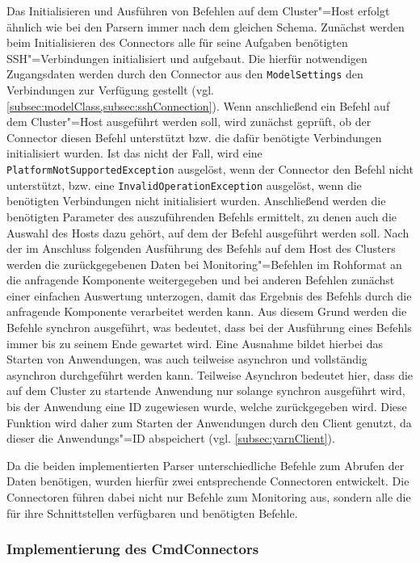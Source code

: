 Das Initialisieren und Ausführen von Befehlen auf dem Cluster"=Host erfolgt ähnlich wie bei den Parsern immer nach dem gleichen Schema.
Zunächst werden beim Initialisieren des Connectors alle für seine Aufgaben benötigten SSH"=Verbindungen initialisiert und aufgebaut.
Die hierfür notwendigen Zugangsdaten werden durch den Connector aus den \texttt{ModelSettings} den Verbindungen zur Verfügung gestellt (vgl. \cref{subsec:modelClass,subsec:sshConnection}).
Wenn anschließend ein Befehl auf dem Cluster"=Host ausgeführt werden soll, wird zunächst geprüft, ob der Connector diesen Befehl unterstützt bzw. die dafür benötigte Verbindungen initialisiert wurden.
Ist das nicht der Fall, wird eine \texttt{PlatformNotSupportedException} ausgelöst, wenn der Connector den Befehl nicht unterstützt, bzw. eine  \texttt{InvalidOperationException} ausgelöst, wenn die benötigten Verbindungen nicht initialisiert wurden.
Anschließend werden die benötigten Parameter des auszuführenden Befehls ermittelt, zu denen auch die Auswahl des Hosts dazu gehört, auf dem der Befehl ausgeführt werden soll.
Nach der im Anschluss folgenden Ausführung des Befehls auf dem Host des Clusters werden die zurückgegebenen Daten bei Monitoring"=Befehlen im Rohformat an die anfragende Komponente weitergegeben und bei anderen Befehlen zunächst einer einfachen Auswertung unterzogen, damit das Ergebnis des Befehls durch die anfragende Komponente verarbeitet werden kann.
Aus diesem Grund werden die Befehle synchron ausgeführt, was bedeutet, dass bei der Ausführung eines Befehls immer bis zu seinem Ende gewartet wird.
Eine Ausnahme bildet hierbei das Starten von Anwendungen, was auch teilweise asynchron und vollständig asynchron durchgeführt werden kann.
Teilweise Asynchron bedeutet hier, dass die auf dem Cluster zu startende Anwendung nur solange synchron ausgeführt wird, bis der Anwendung eine ID zugewiesen wurde, welche zurückgegeben wird.
Diese Funktion wird daher zum Starten der Anwendungen durch den Client genutzt, da dieser die Anwendungs"=ID abspeichert (vgl. \cref{subsec:yarnClient}).

Da die beiden implementierten Parser unterschiedliche Befehle zum Abrufen der Daten benötigen, wurden hierfür zwei entsprechende Connectoren entwickelt.
Die Connectoren führen dabei nicht nur Befehle zum Monitoring aus, sondern alle die für ihre Schnittstellen verfügbaren und benötigten Befehle.

\subsubsection{Implementierung des CmdConnectors}
\label{subsubsec:implCmdConnector}

